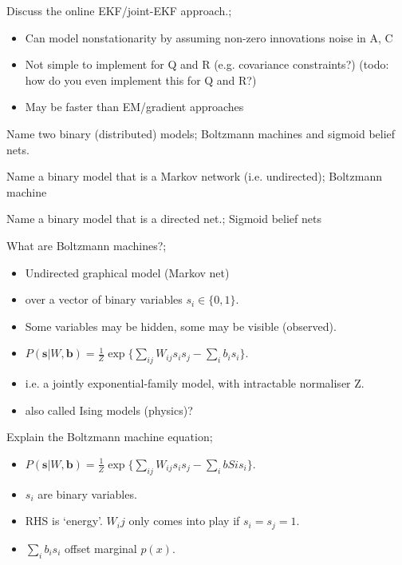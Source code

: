 \documentclass{article}
\begin{document}
Discuss the online EKF/joint-EKF approach.; \begin{itemize} \item Can model nonstationarity by assuming non-zero innovations noise in A, C \item Not simple to implement for Q and R (e.g. covariance constraints?) (todo: how do you even implement this for Q and R?) \item May be faster than EM/gradient approaches \end{itemize}

Name two binary (distributed) models; Boltzmann machines and sigmoid belief nets.

Name a binary model that is a Markov network (i.e. undirected); Boltzmann machine

Name a binary model that is a directed net.; Sigmoid belief nets

What are Boltzmann machines?;\begin{itemize} \item Undirected graphical model (Markov net) \item over a vector of binary variables $s_i\in\{0, 1\}$. \item Some variables may be hidden, some may be visible (observed). \item $P(\mathbf{s}|W, \mathbf{b})=\frac{1}{Z}\exp\{\sum_{ij}W_{ij}s_is_j-\sum_ib_is_i\}$. \item i.e. a jointly exponential-family model, with intractable normaliser Z. \item also called Ising models (physics)? \end{itemize} 

Explain the Boltzmann machine equation; \begin{itemize} \item $P(\mathbf{s}|W, \mathbf{b})=\frac{1}{Z}\exp\{\sum_{ij}W_{ij}s_is_j-\sum_ibSis_i\}$. \item $s_i$ are binary variables. \item RHS is `energy'. $W_ij$ only comes into play if $s_i=s_j=1$. \item $\sum_i b_is_i$ offset marginal $p(x)$. \end{itemize}
\end{document}
